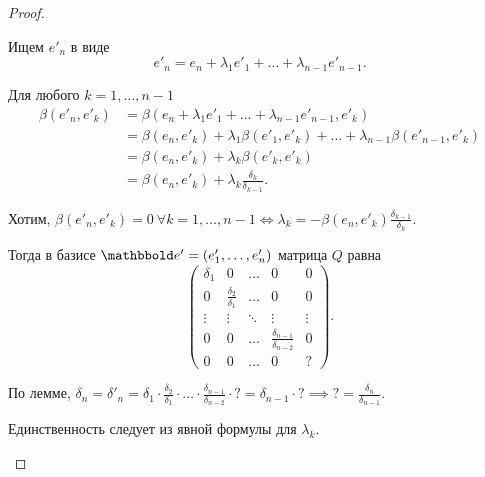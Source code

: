 \documentclass[a4paper]{article}
\begin{document}
\begin{colloq}
\begin{proof}
\begin{description}
                    Ищем $e'_n$ в виде
                    \begin{equation*}
                        e'_n = e_n + \lambda_1 e'_1 + \dots + \lambda_{n - 1} e'_{n - 1}
                    .\end{equation*}

                    Для любого $k = 1, \dots, n - 1$
                    \begin{align*}
                        \beta(e'_n, e'_k) &= \beta(e_n + \lambda_1 e'_1 + \dots + \lambda_{n - 1} e'_{n - 1}, e'_k) \\
                        &= \beta(e_n, e'_k) + \lambda_1 \beta(e'_1, e'_k) + \dots + \lambda_{n - 1} \beta(e'_{n - 1}, e'_k) \\
                        &= \beta(e_n, e'_k) + \lambda_k \beta(e'_k, e'_k) \\
                        &= \beta(e_n, e'_k) + \lambda_k \frac{\delta_k}{\delta_{k - 1}}
                    .\end{align*}

                    Хотим, $\beta(e'_n, e'_k) = 0 \ \forall k = 1, \dots, n - 1 \iff \lambda_k = -\beta(e_n, e'_k) \frac{\delta_{k - 1}}{\delta_k}$.

                    Тогда в базисе $\E' = (e'_1, \dots, e'_n)$ матрица $Q$ равна
                    \begin{equation*}
                        \begin{pmatrix} 
                            \delta_1 & 0 & \dots & 0 & 0 \\
                            0 & \frac{\delta_2}{\delta_1} & \dots & 0 & 0 \\
                            \vdots & \vdots & \ddots & \vdots & \vdots \\
                            0 & 0 & \dots & \frac{\delta_{n - 1}}{\delta_{n - 2}} & 0 \\
                            0 & 0 & \dots & 0 & ?
                        \end{pmatrix}
                    .\end{equation*}

                    По лемме, $\delta_n = \delta'_n = \delta_1 \cdot \frac{\delta_2}{\delta_1} \cdot \dots \cdot \frac{\delta_{n - 1}}{\delta_{n - 2}} \cdot ? = \delta_{n - 1} \cdot ? \implies ? = \frac{\delta_n}{\delta_{n - 1}}$.

                    Единственность следует из явной формулы для $\lambda_k$.
                    \qedhere
                \end{description}
            \end{proof}



\end{colloq}
\end{document}
